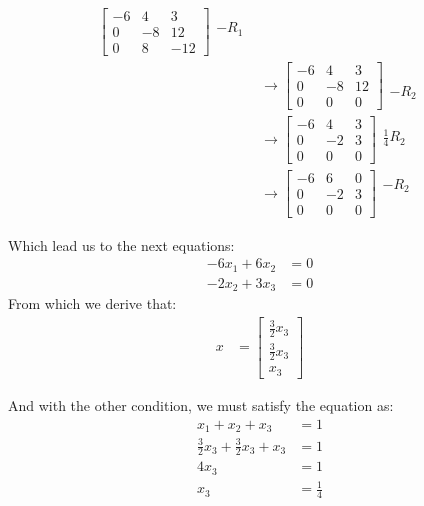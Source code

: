 \documentclass[final,expand]{problemset}
\begin{document}
{\begin{align*}
\begin{bmatrix}
			-6 & 4 & 3\\ 0 & -8 & 12\\ 0 & 8 & -12
		\end{bmatrix}\begin{matrix}
			\\ -R_1\\ \\
		\end{matrix}\\
		&\longrightarrow \begin{bmatrix}
			-6 & 4 & 3\\ 0 & -8 & 12\\ 0 & 0 & 0
		\end{bmatrix} \begin{matrix}
			\\ \\ -R_2
		\end{matrix}\\
		&\longrightarrow \begin{bmatrix}
			-6 & 4 & 3\\ 0 & -2 & 3\\ 0 & 0 & 0
		\end{bmatrix} \begin{matrix}
			\\ \frac{1}{4}R_2 \\ \\
		\end{matrix}\\
		&\longrightarrow \begin{bmatrix}
			-6 & 6 & 0\\ 0 & -2 & 3\\ 0 & 0 & 0
		\end{bmatrix} \begin{matrix}
			-R_2 \\ \\ \\
		\end{matrix}
	\end{align*}

	Which lead us to the next equations:
	\begin{align*}
		-6x_1 + 6x_2 &= 0\\
		-2x_2 + 3x_3 &= 0
	\end{align*}
	From which we derive that:
	\begin{align*}
		x &= \begin{bmatrix}
			\frac{3}{2} x_3 \\ \frac{3}{2} x_3\\ x_3
		\end{bmatrix}
	\end{align*}

	And with the other condition, we must satisfy the equation as:
	\begin{align*}
		x_1 + x_2 + x_3 &= 1\\
		\frac{3}{2}x_3 + \frac{3}{2}x_3 + x_3 &= 1\\
		4x_3 &= 1\\
		x_3 &= \frac{1}{4}
	\end{align*}
}
\end{document}
